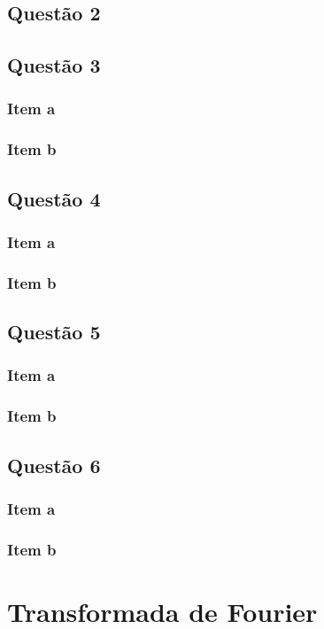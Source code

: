 \documentclass[a4paper, 12pt]{article}
\begin{document}
		\subsection{Questão 2}    
		\subsection{Questão 3} 
			\subsubsection{Item a}
			\subsubsection{Item b}			   
		\subsection{Questão 4}    
			\subsubsection{Item a}
			\subsubsection{Item b}			   		
		\subsection{Questão 5}    
			\subsubsection{Item a}
			\subsubsection{Item b}			   		
		\subsection{Questão 6}    				
			\subsubsection{Item a}
			\subsubsection{Item b}			   								
	\section{Transformada de Fourier}    
\end{document}
